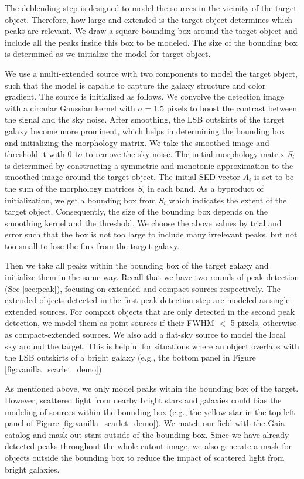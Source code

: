 \documentclass[twocolumn,astrosymb,twocolappendix]{aastex631}
\begin{document}
\begin{CJK*}{UTF8}{gbsn}
The deblending step is designed to model the sources in the vicinity of the target object. Therefore, how large and extended is the target object determines which peaks are relevant. We draw a square bounding box around the target object and include all the peaks inside this box to be modeled. The size of the bounding box is determined as we initialize the model for target object.

We use a multi-extended source with two components to model the target object, such that the model is capable to capture the galaxy structure and color gradient. The source is initialized as follows. We convolve the detection image with a circular Gaussian kernel with $\sigma=1.5$ pixels to boost the contrast between the signal and the sky noise. After smoothing, the LSB outskirts of the target galaxy become more prominent, which helps in determining the bounding box and initializing the morphology matrix. We take the smoothed image and threshold it with $0.1\sigma$ to remove the sky noise. The initial morphology matrix $S_i$ is determined by constructing a symmetric and monotonic approximation to the smoothed image around the target object. The initial SED vector $A_i$ is set to be the sum of the morphology matrices $S_i$ in each band. As a byproduct of initialization, we get a bounding box from $S_i$ which indicates the extent of the target object. Consequently, the size of the bounding box depends on the smoothing kernel and the threshold. We choose the above values by trial and error such that the box is not too large to include many irrelevant peaks, but not too small to lose the flux from the target galaxy. 

Then we take all peaks within the bounding box of the target galaxy and initialize them in the same way. Recall that we have two rounds of peak detection (Sec \ref{sec:peak}), focusing on extended and compact sources respectively. The extended objects detected in the first peak detection step are modeled as single-extended sources. For compact objects that are only detected in the second peak detection, we model them as point sources if their FWHM $<$ 5 pixels, otherwise as compact-extended sources. We also add a flat-sky source to model the local sky around the target. This is helpful for situations where an object overlaps with the LSB outskirts of a bright galaxy (e.g., the bottom panel in Figure \ref{fig:vanilla_scarlet_demo}).

As mentioned above, we only model peaks within the bounding box of the target. However, scattered light from nearby bright stars and galaxies could bias the modeling of sources within the bounding box (e.g., the yellow star in the top left panel of Figure \ref{fig:vanilla_scarlet_demo}). We match our field with the Gaia catalog and mask out stars outside of the bounding box. Since we have already detected peaks throughout the whole cutout image, we also generate a mask for objects outside the bounding box to reduce the impact of scattered light from bright galaxies. 


\end{CJK*}
\end{document}
